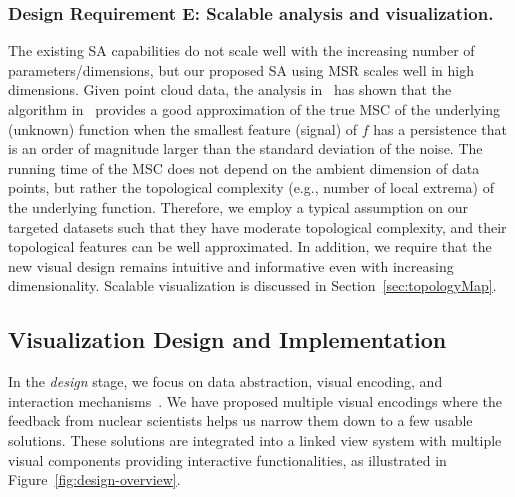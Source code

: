 \subsubsection{Design Requirement E: Scalable analysis and visualization.}

The existing SA capabilities do not scale well with the increasing number of parameters/dimensions, but our proposed SA using MSR scales well in high dimensions.
%
Given point cloud data, the analysis in~\cite{GerberRubelBremer2011} has shown that the algorithm in~\cite{GerberBremerPascucci2010} provides a good approximation of the true MSC of the underlying (unknown) function when the smallest feature (signal) of $f$ has a persistence that is an order of magnitude larger than the standard deviation of the noise.
%
The running time of the MSC does not depend on the ambient dimension of data points, but rather the topological complexity (e.g., number of local extrema) of the underlying function.
%
Therefore, we employ a typical assumption on our targeted datasets such that they have moderate  topological complexity, and their topological features can be well approximated.
%
In addition, we require that the new visual design remains intuitive and informative even with increasing dimensionality.
%
Scalable visualization is discussed in Section~\ref{sec:topologyMap}.

\subsection{Visualization Design and Implementation}
\label{sec:saDesign}

In the \emph{design} stage, we focus on data abstraction, visual encoding, and interaction mechanisms~\cite{SedlmairMeyerMunzner2012}.
%
We have proposed multiple visual encodings where the feedback from nuclear scientists helps us narrow them down to a few usable solutions.
%
These solutions are integrated into a linked view system with multiple visual components providing interactive functionalities, as illustrated in Figure~\ref{fig:design-overview}.

